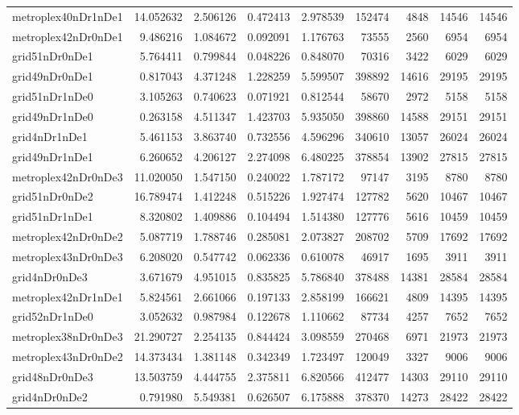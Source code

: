 \begin{longtable}{|l|r|r|r|r|r|r|r|r|}
metroplex40nDr1nDe1 & 14.052632 & 2.506126 & 0.472413 & 2.978539 & 152474 & 4848 & 14546 & 14546 \\
metroplex42nDr0nDe1 & 9.486216 & 1.084672 & 0.092091 & 1.176763 & 73555 & 2560 & 6954 & 6954 \\
grid51nDr0nDe1 & 5.764411 & 0.799844 & 0.048226 & 0.848070 & 70316 & 3422 & 6029 & 6029 \\
grid49nDr0nDe1 & 0.817043 & 4.371248 & 1.228259 & 5.599507 & 398892 & 14616 & 29195 & 29195 \\
grid51nDr1nDe0 & 3.105263 & 0.740623 & 0.071921 & 0.812544 & 58670 & 2972 & 5158 & 5158 \\
grid49nDr1nDe0 & 0.263158 & 4.511347 & 1.423703 & 5.935050 & 398860 & 14588 & 29151 & 29151 \\
grid4nDr1nDe1 & 5.461153 & 3.863740 & 0.732556 & 4.596296 & 340610 & 13057 & 26024 & 26024 \\
grid49nDr1nDe1 & 6.260652 & 4.206127 & 2.274098 & 6.480225 & 378854 & 13902 & 27815 & 27815 \\
metroplex42nDr0nDe3 & 11.020050 & 1.547150 & 0.240022 & 1.787172 & 97147 & 3195 & 8780 & 8780 \\
grid51nDr0nDe2 & 16.789474 & 1.412248 & 0.515226 & 1.927474 & 127782 & 5620 & 10467 & 10467 \\
grid51nDr1nDe1 & 8.320802 & 1.409886 & 0.104494 & 1.514380 & 127776 & 5616 & 10459 & 10459 \\
metroplex42nDr0nDe2 & 5.087719 & 1.788746 & 0.285081 & 2.073827 & 208702 & 5709 & 17692 & 17692 \\
metroplex43nDr0nDe3 & 6.208020 & 0.547742 & 0.062336 & 0.610078 & 46917 & 1695 & 3911 & 3911 \\
grid4nDr0nDe3 & 3.671679 & 4.951015 & 0.835825 & 5.786840 & 378488 & 14381 & 28584 & 28584 \\
metroplex42nDr1nDe1 & 5.824561 & 2.661066 & 0.197133 & 2.858199 & 166621 & 4809 & 14395 & 14395 \\
grid52nDr1nDe0 & 3.052632 & 0.987984 & 0.122678 & 1.110662 & 87734 & 4257 & 7652 & 7652 \\
metroplex38nDr0nDe3 & 21.290727 & 2.254135 & 0.844424 & 3.098559 & 270468 & 6971 & 21973 & 21973 \\
metroplex43nDr0nDe2 & 14.373434 & 1.381148 & 0.342349 & 1.723497 & 120049 & 3327 & 9006 & 9006 \\
grid48nDr0nDe3 & 13.503759 & 4.444755 & 2.375811 & 6.820566 & 412477 & 14303 & 29110 & 29110 \\
grid4nDr0nDe2 & 0.791980 & 5.549381 & 0.626507 & 6.175888 & 378370 & 14273 & 28422 & 28422 \\

\end{longtable}
